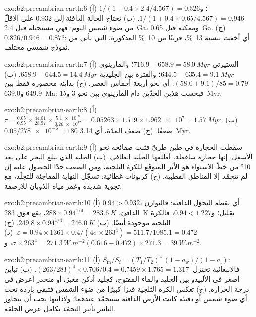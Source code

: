 \begin{solution}{exo:b2:precambrian-earth:6}
(أ) $1/(1 + 0.4\times2.4/4.567) = 0.826$؛ و$1/(1 + 0.4\times0.65/4.567) = 0.946$. (ب) تحتاج الحالة
الدافئة إلى 0.932 على الأقلّ من ضوء شمس اليوم: فهي مستحيلة قبل \qty{2.4}{Ga}، وممكنة
قبل \qty{0.65}{Ga}. (ج) $0.826/0.946 = 0.873$: أي أخفت بنسبة \qty{13}{\percent}، قريبًا من
\qty{10}{\percent} المذكورة، التي تأتي من نموذج شمسي مختلف.
\end{solution}

\begin{solution}{exo:b2:precambrian-earth:7}
(أ) الستيرتي $716.9 - 658.9 = \qty{58.0}{Myr}$؛ والمارينوي $644.5 - 635.4 = \qty{9.1}{Myr}$؛
والفترة بين الجليدية $658.9 - 644.5 = \qty{14.4}{Myr}$. (ب) $(58.0 + 9.1)/85 = 0.79$: أي نحو أربعة أخماس
العصر. (ج) بدايته محصورة فقط بين 649.9 و\qty{639.0}{Ma}: فبحسب هذين
الحدّين دام المارينوي بين نحو 3 و\qty{15}{Myr}.
\end{solution}

\begin{solution}{exo:b2:precambrian-earth:8}
(أ) $\tau = \frac{0.05}{0.95}\times\frac{44.01}{28.97}\times\frac{\num{5.1e18}}{\num{0.26e12}} =
0.05263\times1.519\times\num{1.962e7} = \qty{1.57}{Myr}$. (ب) $0.05/\num{278e-6} = 180$ ضعفًا.
(ج) ضعف المدّة، أي \qty{3.14}{Myr}.
\end{solution}

\begin{solution}{exo:b2:precambrian-earth:9}
(أ) سقطت الحجارة في طين طريّ فثنت صفائحه نحو الأسفل: إنها حجارة ساقطة، أطلقها
الجليد الطافي. (ب) الجليد الذي يبلغ البحر على بعد \ang{10} من خطّ الاستواء هو الأثر المتوقّع
للكرة الثلجية، ومن الصعب جدًا الحصول عليه إن لم تتجمّد إلا المناطق القطبية. (ج) كربونات غطائية:
تسجّل النهاية المفاجئة للتجلّد، مع تجوية شديدة وغمر مياه الذوبان
للأرصفة.
\end{solution}

\begin{solution}{exo:b2:precambrian-earth:10}
(أ) $0.94 > 0.932$، أي نقطة التحوّل الدافئة: فالتوازن الدافئ، $288\times0.94^{1/4} =
\qty{283.6}{K}$، يقع فوق \qty{283}{K} بقليل؛ و$0.94 < 1.227$، فالكرة الثلجية موجودة أيضًا.
(ب) $249.8\times0.94^{1/4} = \qty{246.0}{K}$. (ج) $\varepsilon = 0.94\times1361\times0.4/(4\sigma
\times263^4) = 511.7/1085.1 = 0.472$. (د) $\sigma\times263^4 = \qty{271.3}{W.m^{-2}}$، و$(0.616
- 0.472)\times271.3 = \qty{39}{W.m^{-2}}$.
\end{solution}

\begin{solution}{exo:b2:precambrian-earth:11}
(أ) $S_{\text{m}}/S_{\text{f}} = (T_1/T_2)^4\,(1 - a_{\text{w}})/(1 - a_{\text{i}})$: فالانبعاثية
تختزل. $(263/283)^4\times0.706/0.4 = 0.7459\times1.765 = 1.317$. (ب) تباين أصغر
في الألبيدو بين الجليد والماء المفتوح، كجليد أدكن مغبرّ، أو منحدر أعرض في
درجة الحرارة. (ج) تعكس الكرة الثلجية قدرًا كبيرًا من ضوء الشمس فتبقى باردة تحت أي ضوء شمس أو
دفيئة كانت الأرض الدافئة ستتجمّد عندهما؛ ولإذابتها يجب أن يتجاوز التأثير تأثير
التجمّد بكامل عرض الحلقة.
\end{solution}


